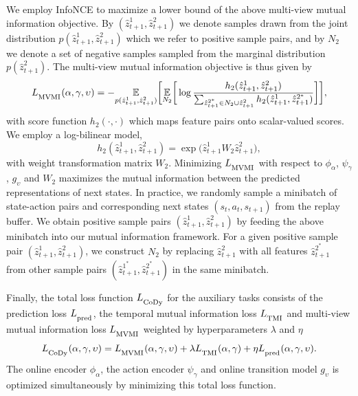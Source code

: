 \documentclass[a4paper,12pt]{article}
\begin{document}
We employ InfoNCE to maximize a lower bound of the above multi-view mutual information objective. By $(\hat{z}_{t+1}^1, \hat{z}_{t+1}^2)$ we denote samples drawn from the joint distribution $p(\hat{z}_{t+1}^1, \hat{z}_{t+1}^2)$ which we refer to positive sample pairs, and by $N_2$ we denote a set of negative samples sampled from the marginal distribution $p(\hat{z}_{t+1}^2)$. 
The multi-view mutual information objective is thus given by
\begin{equation}
    L_{\textsubscript{MVMI}}(\alpha, \gamma, \upsilon) = - \underset{p(\hat{z}_{t+1}^1, \hat{z}_{t+1}^2)}{\mathbb{E}}\bigg[ \underset{N_2}{\mathbb{E}}\bigg[\log\frac{h_2(\hat{z}_{t+1}^1, \hat{z}_{t+1}^2)}{\sum_{\hat{z}_{t+1}^{2^*} \in N_2 \cup \hat{z}_{t+1}^2}h_2(\hat{z}_{t+1}^1, \hat{z}_{t+1}^{2^*})}\bigg]\bigg],
\label{eq:mv}
\end{equation}
with score function $h_2(\cdot,\cdot)$ which maps feature pairs onto scalar-valued scores. We employ a log-bilinear model,
\begin{equation}
    h_2(\hat{z}_{t+1}^1, \hat{z}_{t+1}^2) = \exp \big(\hat{z}_{t+1}^1 W_2 \hat{z}_{t+1}^2 \big),
\end{equation}
with weight transformation matrix $W_2$. Minimizing $L_{\textsubscript{MVMI}}$ with respect to $\phi_\alpha$, $\psi_\gamma$, $g_\upsilon$ and $W_2$ maximizes the mutual information between the predicted representations of next states. In practice, we randomly sample a minibatch of state-action pairs and corresponding next states $(s_t, a_t, s_{t+1})$ from the replay buffer. We obtain positive sample pairs $(\hat{z}_{t+1}^1, \hat{z}_{t+1}^2)$ by feeding the above minibatch into our mutual information framework. For a given positive sample pair $(\hat{z}_{t+1}^1, \hat{z}_{t+1}^2)$, we construct $N_2$ by replacing $\hat{z}_{t+1}^2$ with all features $\hat{z}_{t+1}^{2^*}$ from other sample pairs $(\hat{z}_{t+1}^{1^*}, \hat{z}_{t+1}^{2^*})$ in the same minibatch.\par

Finally, the total loss function $L_{\textsubscript{CoDy}}$ for the auxiliary tasks consists of the prediction loss $L_{\textsubscript{pred}}$, the temporal mutual information loss  $L_{\textsubscript{TMI}}$ and multi-view mutual information loss $L_{\textsubscript{MVMI}}$ weighted by hyperparameters $\lambda$ and $\eta$
\begin{equation}\label{eq:total}
    L_{\textsubscript{CoDy}}(\alpha, \gamma, \upsilon) = L_{\textsubscript{MVMI}}(\alpha, \gamma, \upsilon) + \lambda L_{\textsubscript{TMI}}(\alpha, \gamma) + \eta L_{\textsubscript{pred}}(\alpha, \gamma, \upsilon).
\end{equation}
The online encoder $\phi_\alpha$, the action encoder $\psi_\gamma$ and online transition model $g_\upsilon$ is optimized simultaneously by minimizing this total loss function. 
\end{document}
